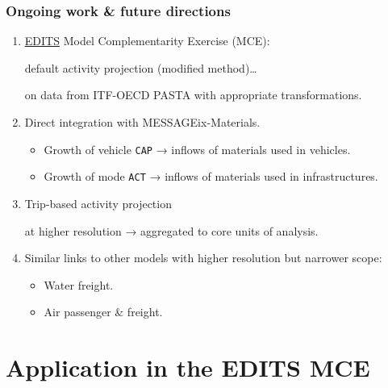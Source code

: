 \documentclass[12pt,aspectratio=169]{beamer}
\begin{document}
\begin{frame}
\frametitle{Ongoing work \& future directions}

\begin{enumerate}
  \item \href{https://iiasa.ac.at/projects/edits}{EDITS} Model Complementarity Exercise (MCE):

   default activity projection (modified \textcite{schafer-2009} method)…

   on data from ITF-OECD PASTA with appropriate transformations.
  \item Direct integration with MESSAGEix-Materials.
  \begin{itemize}
    \item Growth of vehicle \texttt{CAP} → inflows of materials used in vehicles.
    \item Growth of mode \texttt{ACT} → inflows of materials used in infrastructures.
  \end{itemize}
  \item Trip-based activity projection

  at higher resolution → aggregated to core units of analysis.
  \item Similar links to other models with higher resolution but narrower scope:
  \begin{itemize}
    \item Water freight.
    \item Air passenger \& freight.
  \end{itemize}
\end{enumerate}

\end{frame}

\section{Application in the EDITS MCE}
\end{document}
